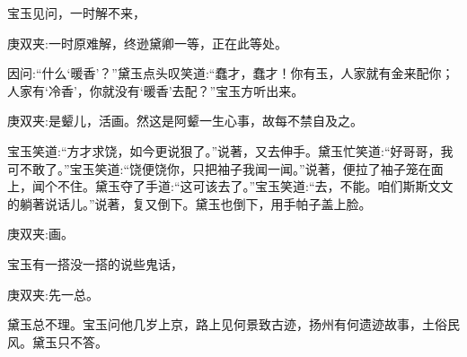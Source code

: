 \begin{parag}
    宝玉见问，一时解不来，\begin{note}庚双夹:一时原难解，终逊黛卿一等，正在此等处。\end{note}因问:“什么‘暖香’？”黛玉点头叹笑道:“蠢才，蠢才！你有玉，人家就有金来配你；人家有‘冷香’，你就没有‘暖香’去配？”宝玉方听出来。\begin{note}庚双夹:是颦儿，活画。然这是阿颦一生心事，故每不禁自及之。\end{note}宝玉笑道:“方才求饶，如今更说狠了。”说著，又去伸手。黛玉忙笑道:“好哥哥，我可不敢了。”宝玉笑道:“饶便饶你，只把袖子我闻一闻。”说著，便拉了袖子笼在面上，闻个不住。黛玉夺了手道:“这可该去了。”宝玉笑道:“去，不能。咱们斯斯文文的躺著说话儿。”说著，复又倒下。黛玉也倒下，用手帕子盖上脸。\begin{note}庚双夹:画。\end{note}宝玉有一搭没一搭的说些鬼话，\begin{note}庚双夹:先一总。\end{note}黛玉总不理。宝玉问他几岁上京，路上见何景致古迹，扬州有何遗迹故事，土俗民风。黛玉只不答。
\end{parag}


